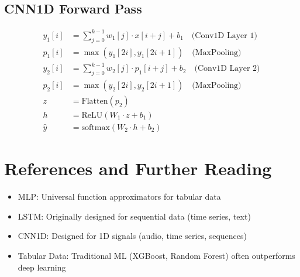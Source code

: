 \documentclass[12pt]{article}
\begin{document}
\subsection{CNN1D Forward Pass}

\[
\begin{aligned}
y_1[i] &= \sum_{j=0}^{k-1} w_1[j] \cdot x[i+j] + b_1 \quad \text{(Conv1D Layer 1)} \\
p_1[i] &= \max(y_1[2i], y_1[2i+1]) \quad \text{(MaxPooling)} \\
y_2[i] &= \sum_{j=0}^{k-1} w_2[j] \cdot p_1[i+j] + b_2 \quad \text{(Conv1D Layer 2)} \\
p_2[i] &= \max(y_2[2i], y_2[2i+1]) \quad \text{(MaxPooling)} \\
z &= \text{Flatten}(p_2) \\
h &= \text{ReLU}(W_1 \cdot z + b_1) \\
\hat{y} &= \text{softmax}(W_2 \cdot h + b_2)
\end{aligned}
\]

\section{References and Further Reading}

\begin{itemize}
    \item MLP: Universal function approximators for tabular data
    \item LSTM: Originally designed for sequential data (time series, text)
    \item CNN1D: Designed for 1D signals (audio, time series, sequences)
    \item Tabular Data: Traditional ML (XGBoost, Random Forest) often outperforms deep learning
\end{itemize}
\end{document}
